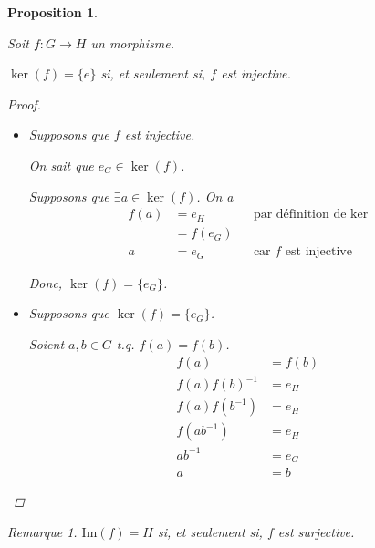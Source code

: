 \documentclass{report}
\newtheorem*{prop}{Proposition}
\theoremstyle{definition}
\theoremstyle{remark}
\newtheorem*{rema}{Remarque}
\begin{document}
	\begin{prop}~

		Soit $f:G \to H$ un morphisme.

		$\ker(f) = \{e\}$ si, et seulement si, $f$ est injective.
		\begin{proof}~

			\begin{itemize}
				\item[$(\Leftarrow)$] Supposons que $f$ est injective.

				On sait que $e_G \in \ker(f)$.

				Supposons que $\exists a \in \ker(f)$. On a
				\begin{align*}
					f(a)&= e_H&&\text{par d\'efinition de }\ker\\
					&= f(e_G)\\
					a&= e_G&&\text{car $f$ est injective}
				\end{align*}

				Donc, $\ker(f) = \{e_G\}$.
				\item[$(\Rightarrow)$] Supposons que $\ker(f) = \{e_G\}$.

				Soient $a,b \in G$ t.q. $f(a) = f(b)$.
				\begin{align*}
					f(a)&= f(b)\\
					f(a)f(b)^{-1}&= e_H\\
					f(a)f(b^{-1})&= e_H\\
					f(ab^{-1})&= e_H\\
					ab^{-1}&= e_G\\
					a&= b
				\end{align*}
			\end{itemize}
		\end{proof}
		\begin{rema}
			$\mathrm{Im}(f)=H$ si, et seulement si, $f$ est surjective.
		\end{rema}
	\end{prop}
\end{document}
